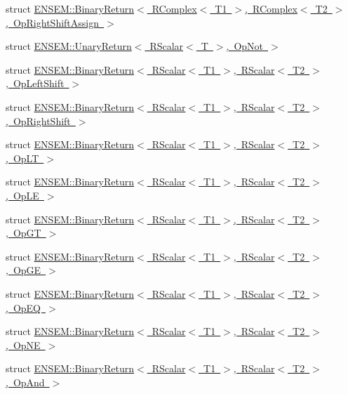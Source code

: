 \begin{DoxyCompactItemize}
struct \mbox{\hyperlink{structENSEM_1_1BinaryReturn_3_01RComplex_3_01T1_01_4_00_01RComplex_3_01T2_01_4_00_01OpRightShiftAssign_01_4}{E\+N\+S\+E\+M\+::\+Binary\+Return$<$ R\+Complex$<$ T1 $>$, R\+Complex$<$ T2 $>$, Op\+Right\+Shift\+Assign $>$}}
\item 
struct \mbox{\hyperlink{structENSEM_1_1UnaryReturn_3_01RScalar_3_01T_01_4_00_01OpNot_01_4}{E\+N\+S\+E\+M\+::\+Unary\+Return$<$ R\+Scalar$<$ T $>$, Op\+Not $>$}}
\item 
struct \mbox{\hyperlink{structENSEM_1_1BinaryReturn_3_01RScalar_3_01T1_01_4_00_01RScalar_3_01T2_01_4_00_01OpLeftShift_01_4}{E\+N\+S\+E\+M\+::\+Binary\+Return$<$ R\+Scalar$<$ T1 $>$, R\+Scalar$<$ T2 $>$, Op\+Left\+Shift $>$}}
\item 
struct \mbox{\hyperlink{structENSEM_1_1BinaryReturn_3_01RScalar_3_01T1_01_4_00_01RScalar_3_01T2_01_4_00_01OpRightShift_01_4}{E\+N\+S\+E\+M\+::\+Binary\+Return$<$ R\+Scalar$<$ T1 $>$, R\+Scalar$<$ T2 $>$, Op\+Right\+Shift $>$}}
\item 
struct \mbox{\hyperlink{structENSEM_1_1BinaryReturn_3_01RScalar_3_01T1_01_4_00_01RScalar_3_01T2_01_4_00_01OpLT_01_4}{E\+N\+S\+E\+M\+::\+Binary\+Return$<$ R\+Scalar$<$ T1 $>$, R\+Scalar$<$ T2 $>$, Op\+L\+T $>$}}
\item 
struct \mbox{\hyperlink{structENSEM_1_1BinaryReturn_3_01RScalar_3_01T1_01_4_00_01RScalar_3_01T2_01_4_00_01OpLE_01_4}{E\+N\+S\+E\+M\+::\+Binary\+Return$<$ R\+Scalar$<$ T1 $>$, R\+Scalar$<$ T2 $>$, Op\+L\+E $>$}}
\item 
struct \mbox{\hyperlink{structENSEM_1_1BinaryReturn_3_01RScalar_3_01T1_01_4_00_01RScalar_3_01T2_01_4_00_01OpGT_01_4}{E\+N\+S\+E\+M\+::\+Binary\+Return$<$ R\+Scalar$<$ T1 $>$, R\+Scalar$<$ T2 $>$, Op\+G\+T $>$}}
\item 
struct \mbox{\hyperlink{structENSEM_1_1BinaryReturn_3_01RScalar_3_01T1_01_4_00_01RScalar_3_01T2_01_4_00_01OpGE_01_4}{E\+N\+S\+E\+M\+::\+Binary\+Return$<$ R\+Scalar$<$ T1 $>$, R\+Scalar$<$ T2 $>$, Op\+G\+E $>$}}
\item 
struct \mbox{\hyperlink{structENSEM_1_1BinaryReturn_3_01RScalar_3_01T1_01_4_00_01RScalar_3_01T2_01_4_00_01OpEQ_01_4}{E\+N\+S\+E\+M\+::\+Binary\+Return$<$ R\+Scalar$<$ T1 $>$, R\+Scalar$<$ T2 $>$, Op\+E\+Q $>$}}
\item 
struct \mbox{\hyperlink{structENSEM_1_1BinaryReturn_3_01RScalar_3_01T1_01_4_00_01RScalar_3_01T2_01_4_00_01OpNE_01_4}{E\+N\+S\+E\+M\+::\+Binary\+Return$<$ R\+Scalar$<$ T1 $>$, R\+Scalar$<$ T2 $>$, Op\+N\+E $>$}}
\item 
struct \mbox{\hyperlink{structENSEM_1_1BinaryReturn_3_01RScalar_3_01T1_01_4_00_01RScalar_3_01T2_01_4_00_01OpAnd_01_4}{E\+N\+S\+E\+M\+::\+Binary\+Return$<$ R\+Scalar$<$ T1 $>$, R\+Scalar$<$ T2 $>$, Op\+And $>$}}

\end{DoxyCompactItemize}
